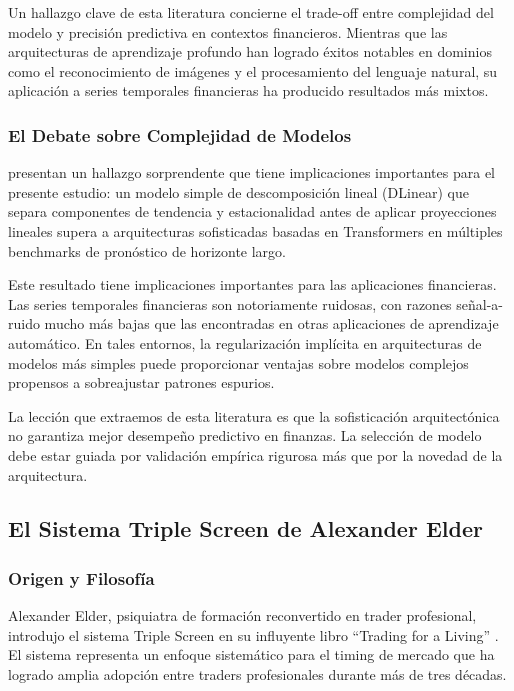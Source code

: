 \documentclass[11pt,a4paper]{article}
\begin{document}
Un hallazgo clave de esta literatura concierne el trade-off entre complejidad del modelo y precisión predictiva en contextos financieros. Mientras que las arquitecturas de aprendizaje profundo han logrado éxitos notables en dominios como el reconocimiento de imágenes y el procesamiento del lenguaje natural, su aplicación a series temporales financieras ha producido resultados más mixtos.

\subsubsection{El Debate sobre Complejidad de Modelos}

\citet{zeng2023} presentan un hallazgo sorprendente que tiene implicaciones importantes para el presente estudio: un modelo simple de descomposición lineal (DLinear) que separa componentes de tendencia y estacionalidad antes de aplicar proyecciones lineales supera a arquitecturas sofisticadas basadas en Transformers en múltiples benchmarks de pronóstico de horizonte largo.

Este resultado tiene implicaciones importantes para las aplicaciones financieras. Las series temporales financieras son notoriamente ruidosas, con razones señal-a-ruido mucho más bajas que las encontradas en otras aplicaciones de aprendizaje automático. En tales entornos, la regularización implícita en arquitecturas de modelos más simples puede proporcionar ventajas sobre modelos complejos propensos a sobreajustar patrones espurios.

La lección que extraemos de esta literatura es que la sofisticación arquitectónica no garantiza mejor desempeño predictivo en finanzas. La selección de modelo debe estar guiada por validación empírica rigurosa más que por la novedad de la arquitectura.

\subsection{El Sistema Triple Screen de Alexander Elder}

\subsubsection{Origen y Filosofía}

Alexander Elder, psiquiatra de formación reconvertido en trader profesional, introdujo el sistema Triple Screen en su influyente libro ``Trading for a Living'' \citep{elder1993}. El sistema representa un enfoque sistemático para el timing de mercado que ha logrado amplia adopción entre traders profesionales durante más de tres décadas.
\end{document}
